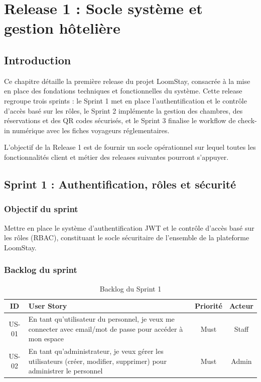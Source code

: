 
\chapter{Release 1 : Socle système et gestion hôtelière}
\label{chap:release1}

\section*{Introduction}

Ce chapitre détaille la première release du projet LoomStay, consacrée à la mise en place des fondations techniques et fonctionnelles du système. Cette release regroupe trois sprints : le Sprint 1 met en place l'authentification et le contrôle d'accès basé sur les rôles, le Sprint 2 implémente la gestion des chambres, des réservations et des QR codes sécurisés, et le Sprint 3 finalise le workflow de check-in numérique avec les fiches voyageurs réglementaires.

L'objectif de la Release 1 est de fournir un socle opérationnel sur lequel toutes les fonctionnalités client et métier des releases suivantes pourront s'appuyer.

\section{Sprint 1 : Authentification, rôles et sécurité}
\label{sec:sprint1}

\subsection{Objectif du sprint}

Mettre en place le système d'authentification JWT et le contrôle d'accès basé sur les rôles (RBAC), constituant le socle sécuritaire de l'ensemble de la plateforme LoomStay.

\subsection{Backlog du sprint}

\begin{table}[H]
\centering
\caption{Backlog du Sprint 1}
\label{tab:backlog_sprint1}
\begin{tabular}{|c|p{9cm}|c|c|}
\hline
\textbf{ID} & \textbf{User Story} & \textbf{Priorité} & \textbf{Acteur} \\
\hline
US-01 & En tant qu'utilisateur du personnel, je veux me connecter avec email/mot de passe pour accéder à mon espace & Must & Staff \\
\hline
US-02 & En tant qu'administrateur, je veux gérer les utilisateurs (créer, modifier, supprimer) pour administrer le personnel & Must & Admin \\
\hline
\end{tabular}
\end{table}

